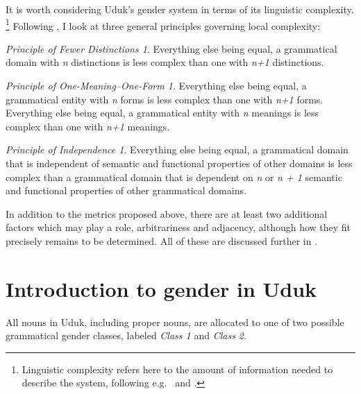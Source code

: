 \documentclass[output=collectionpaper,hidelinks]{langscibook}
\theoremstyle{remark}
\newtheorem*{principle-distinct}{Principle of Fewer Distinctions}
\newtheorem*{principle-transparency}{Principle of One-Meaning–One-Form}
\newtheorem*{principle-independence}{Principle of Independence}
\begin{document}
It is worth considering Uduk's gender system in terms of its linguistic
complexity.%
\footnote{Linguistic complexity refers here to the amount of
information needed to describe the system, following e.g.\ \citet{Dahl2004} and \citet{Miestamo2008}.} %
Following \citet[50]{DiGarbo2016}, I look at three
general principles governing local complexity:

\begin{principle-distinct}
\hfill \break
Everything else being equal, a grammatical domain with \emph{n} distinctions is less complex than one with \emph{n+1} distinctions.
\end{principle-distinct}

\begin{principle-transparency}
\hfill \break
Everything else being equal, a grammatical entity with \emph{n} forms is less complex than one with \emph{n+1} forms. \newline
Everything else being equal, a grammatical entity with \emph{n} meanings is less complex than one with \emph{n+1} meanings.
\end{principle-transparency}

\begin{principle-independence}
\hfill \break
Everything else being equal, a grammatical domain that is independent of semantic and functional properties of other domains is less complex than a grammatical domain that is dependent on \emph{n} or \emph{n + 1} semantic and functional properties of other grammatical domains.
\end{principle-independence}

In addition to the metrics proposed above, there are at least two additional
factors which may play a role, arbitrariness and adjacency, although how they
fit precisely remains to be determined. All of these are discussed further in
.

\section{Introduction to gender in Uduk}
\label{sec:Introduction_to_gender_in_Uduk}

All nouns in Uduk, including proper nouns, are allocated to one of two
possible grammatical gender classes, labeled \emph{Class 1} and \emph{Class
2}.
\end{document}
